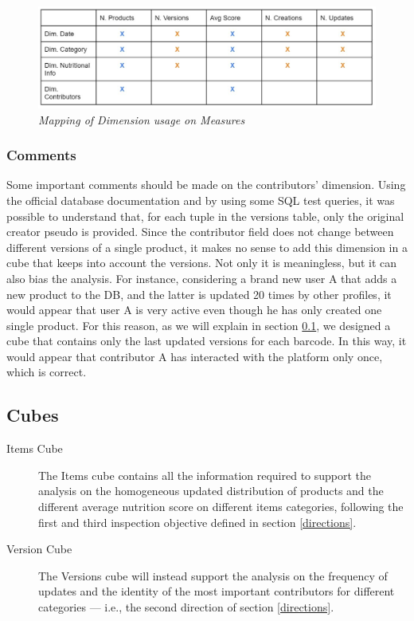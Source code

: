 \documentclass[runningheads]{llncs}
\begin{document}
\begin{figure}
    \includegraphics[width=\textwidth]{MeasuresAndDimTable.JPG}
    \caption{\emph{Mapping of Dimension usage on Measures}}
    \label{fig1}
\end{figure}

\subsubsection{Comments} Some important comments should be made on the contributors' dimension. Using the official database documentation \cite{OFF_doc} and by using some SQL test queries, it was possible to understand that, for each tuple in the versions table, only the original creator pseudo is provided. Since the contributor field does not change between different versions of a single product, it makes no sense to add this dimension in a cube that keeps into account the versions. Not only it is meaningless, but it can also bias the analysis. For instance, considering a brand new user A that adds a new product to the DB, and the latter is updated 20 times by other profiles, it would appear that user A is very active even though he has only created one single product. For this reason, as we will explain in section \ref{cubes}, we designed a cube that contains only the last updated versions for each barcode. In this way, it would appear that contributor A has interacted with the platform only once, which is correct.

\subsection{Cubes}\label{cubes}
\begin{description}
    \item[Items Cube] The Items cube contains all the information required to support the analysis on the homogeneous updated distribution of products and the different average nutrition score on different items categories, following the first and third inspection objective defined in section \ref{directions}. 
    \item[Version Cube] The Versions cube will instead support the analysis on the frequency of updates and the identity of the most important contributors for different categories — i.e., the second direction of section \ref{directions}.
\end{description}
\end{document}
